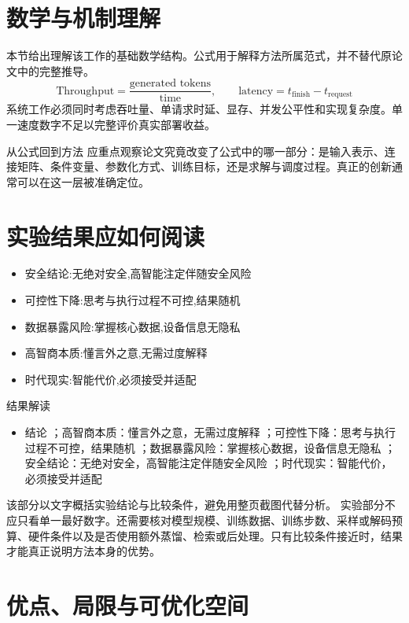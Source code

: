 \documentclass[UTF8,11pt,a4paper]{ctexart}
\begin{document}
\section{数学与机制理解}
本节给出理解该工作的基础数学结构。公式用于解释方法所属范式，并不替代原论文中的完整推导。
\begin{equation}
\text{Throughput}=\frac{\text{generated tokens}}{\text{time}},\qquad \text{latency}=t_{\mathrm{finish}}-t_{\mathrm{request}}
\end{equation}
系统工作必须同时考虑吞吐量、单请求时延、显存、并发公平性和实现复杂度。单一速度数字不足以完整评价真实部署收益。

\begin{keybox}{从公式回到方法}
应重点观察论文究竟改变了公式中的哪一部分：是输入表示、连接矩阵、条件变量、参数化方式、训练目标，还是求解与调度过程。真正的创新通常可以在这一层被准确定位。
\end{keybox}


\section{实验结果应如何阅读}
\begin{itemize}
\item 安全结论:无绝对安全,高智能注定伴随安全风险
\item 可控性下降:思考与执行过程不可控,结果随机
\item 数据暴露风险:掌握核心数据,设备信息无隐私
\item 高智商本质:懂言外之意,无需过度解释
\item 时代现实:智能代价,必须接受并适配
\end{itemize}

\begin{notebox}{结果解读}
\begin{itemize}
\item 结论 ；高智商本质：懂言外之意，无需过度解释 ；可控性下降：思考与执行过程不可控，结果随机 ；数据暴露风险：掌握核心数据，设备信息无隐私 ；安全结论：无绝对安全，高智能注定伴随安全风险 ；时代现实：智能代价，必须接受并适配
\end{itemize}
\end{notebox}

该部分以文字概括实验结论与比较条件，避免用整页截图代替分析。
实验部分不应只看单一最好数字。还需要核对模型规模、训练数据、训练步数、采样或解码预算、硬件条件以及是否使用额外蒸馏、检索或后处理。只有比较条件接近时，结果才能真正说明方法本身的优势。

\section{优点、局限与可优化空间}
\end{document}
